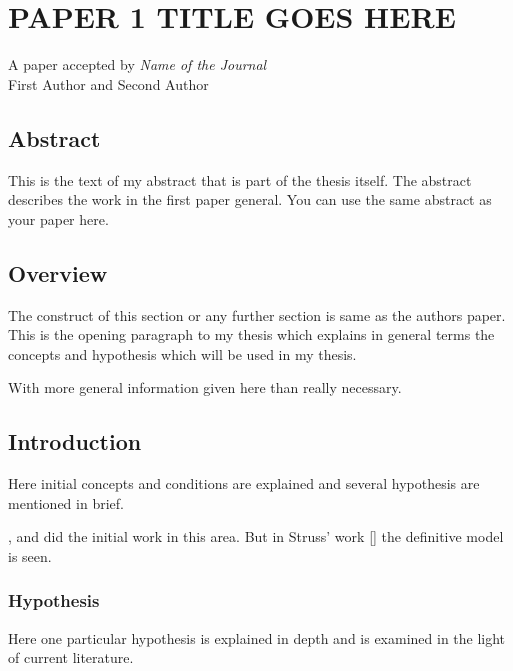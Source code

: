 \chapter{PAPER 1 TITLE GOES HERE}
\label{polymer_fibers}

\begin{center}
    A paper accepted by \textit{Name of the Journal} \\
    First Author and Second Author
\end{center}

\section{Abstract}
This is the text of my abstract that is part of the thesis itself.
The abstract describes the work in the first paper general. You can use the same abstract as your paper here.



\section{Overview}

The  construct of this section or any further section is same as the authors paper.
This is the opening paragraph to my thesis which
explains in general terms the concepts and hypothesis
which will be used in my thesis.

With more general information given here than really
necessary.

\section{Introduction}

Here initial concepts and conditions are explained and
several hypothesis are mentioned in brief.

\cite{allen}, \cite{bruner} and \cite{cox}
did the initial work in this area. But in Struss' work [\cite{struss}]
the definitive model is seen.

\subsection{Hypothesis}

Here one particular hypothesis is explained in depth
and is examined in the light of current literature.

